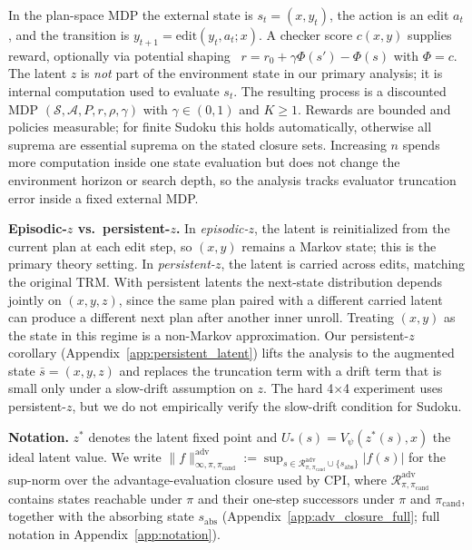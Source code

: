 \documentclass{article}
\theoremstyle{plain}
\theoremstyle{definition}
\theoremstyle{remark}
\begin{document}
In the plan-space MDP the external state is $s_t=(x,y_t)$, the action is an edit $a_t$, and the transition is $y_{t+1}=\mathrm{edit}(y_t,a_t;x)$. A checker score $c(x,y)$ supplies reward, optionally via potential shaping~\citep{Ng1999Shaping} $r=r_0+\gamma\Phi(s')-\Phi(s)$ with $\Phi=c$. The latent $z$ is \emph{not} part of the environment state in our primary analysis; it is internal computation used to evaluate $s_t$. The resulting process is a discounted MDP $(\mathcal S,\mathcal A,P,r,\rho,\gamma)$ with $\gamma\in(0,1)$ and $K\ge 1$. Rewards are bounded and policies measurable; for finite Sudoku this holds automatically, otherwise all suprema are essential suprema on the stated closure sets. Increasing $n$ spends more computation inside one state evaluation but does not change the environment horizon or search depth, so the analysis tracks evaluator truncation error inside a fixed external MDP.

\textbf{Episodic-$z$ vs.\ persistent-$z$.}
In \emph{episodic-$z$}, the latent is reinitialized from the current plan at each edit step, so $(x,y)$ remains a Markov state; this is the primary theory setting. In \emph{persistent-$z$}, the latent is carried across edits, matching the original TRM. With persistent latents the next-state distribution depends jointly on $(x,y,z)$, since the same plan paired with a different carried latent can produce a different next plan after another inner unroll. Treating $(x,y)$ as the state in this regime is a non-Markov approximation. Our persistent-$z$ corollary (Appendix~\ref{app:persistent_latent}) lifts the analysis to the augmented state $\bar s=(x,y,z)$ and replaces the truncation term with a drift term that is small only under a slow-drift assumption on $z$. The hard 4$\times$4 experiment uses persistent-$z$, but we do not empirically verify the slow-drift condition for Sudoku.

\textbf{Notation.}
$z^*$ denotes the latent fixed point and $U_*(s)=V_\psi(z^*(s),x)$ the ideal latent value. We write $\|f\|_{\infty,\pi,\pi_{\mathrm{cand}}}^{\mathrm{adv}}:=\sup_{s\in\mathcal{R}_{\pi,\pi_{\mathrm{cand}}}^{\mathrm{adv}}\cup\{s_{\mathrm{abs}}\}}|f(s)|$ for the sup-norm over the advantage-evaluation closure used by CPI, where $\mathcal{R}_{\pi,\pi_{\mathrm{cand}}}^{\mathrm{adv}}$ contains states reachable under $\pi$ and their one-step successors under $\pi$ and $\pi_{\mathrm{cand}}$, together with the absorbing state $s_{\mathrm{abs}}$ (Appendix~\ref{app:adv_closure_full}; full notation in Appendix~\ref{app:notation}).
\end{document}
